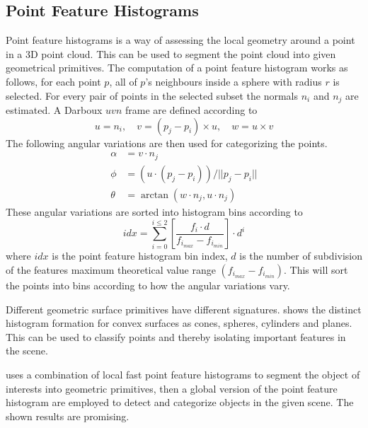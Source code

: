 \subsection{Point Feature Histograms}
Point feature histograms is a way of assessing the local geometry around a point in a
3D point cloud. This can be used to segment the point cloud into given geometrical
primitives. The computation of a point feature histogram works as follows, for each point
$p$, all of $p$'s neighbours inside a sphere with radius $r$ is selected. For every pair
of points in the selected subset the normals $n_i$ and $n_j$ are estimated. A Darboux
$uvn$ frame are defined according to 
\begin{equation}
    u = n_i, \quad v = (p_j - p_i)\times u, \quad w = u \times v
\end{equation}
The following angular variations are then used for categorizing the points. \cite{pfh}
\begin{equation}
    \begin{aligned}
        \alpha &= v \cdot n_j \\
        \phi &= (u \cdot (p_j - p_i)) / || p_j - p_i|| \\
        \theta &= \arctan (w \cdot n_j, u \cdot n_j)
    \end{aligned}
\end{equation}
These angular variations are sorted into histogram bins according to 
\begin{equation}
    idx = \sum_{i=0}^{i \leq 2} \left [ \frac{f_i \cdot d}{f_{i_{max}} - f_{i_{min}}}
    \right] \cdot d^i
\end{equation}
where $idx$ is the point feature histogram bin index, $d$ is the number of subdivision of
the features maximum theoretical value range $(f_{i_{max}} - f_{i_{min}})$. This will sort
the points into bins according to how the angular variations vary. 

Different geometric surface primitives have different signatures. \cite{pfh-geometric}
shows the distinct histogram formation for convex surfaces as cones, spheres, cylinders
and planes. This can be used to classify points and thereby isolating important features
in the scene. 

\cite{pfh-segmenting} uses a combination of local fast point feature histograms to segment
the object of interests into geometric primitives, then a global version of the point
feature histogram are employed to detect and categorize objects in the given scene. The
shown results are promising. 


